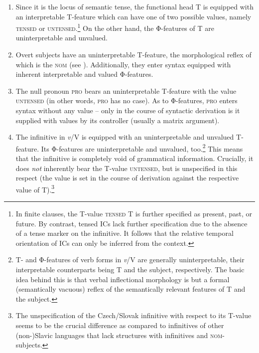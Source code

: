 \documentclass[output=paper,colorlinks,citecolor=brown,
modfonts,newtxmath
]{langscibook}
\begin{document}
\begin{enumerate}

\item Since it is the locus of semantic tense, the functional head T is equipped with an interpretable T-feature which can have one of two possible values, namely \textsc{tensed} or \textsc{untensed}.\footnote{In finite clauses, the T-value \textsc{tensed} T is further specified as present, past, or future. By contrast, tensed ICs lack further specification due to the absence of a tense marker on the infinitive. It follows that the relative temporal orientation of ICs can only be inferred from the context.} On the other hand, the Φ-features of T are uninterpretable and unvalued.

\item Overt subjects have an uninterpretable T-feature, the morphological reflex of which is the \textsc{nom} (see \citealt{PesetskyTorrego2001}). Additionally, they enter syntax equipped with inherent interpretable and valued Φ-features.

\item The null pronoun \textsc{pro} bears an uninterpretable T-feature with the value \textsc{untensed} (in other words, \textsc{pro} has no case). As to Φ-features, \textsc{pro} enters syntax without any value -- only in the course of syntactic derivation is it supplied with values by its controller (usually a matrix argument).

\item The infinitive in \textit{v}/V is equipped with an uninterpretable and unvalued T-feature. Its Φ-features are uninterpretable and unvalued, too.\footnote{T- and Φ-features of verb forms in \textit{v}/V are generally uninterpretable, their interpretable counterparts being T and the subject, respectively. The basic idea behind this is that verbal inflectional morphology is but a formal (semantically vacuous) reflex of the semantically relevant features of T and the subject.} This means that the infinitive is completely void of grammatical information. Crucially, it does \textit{not} inherently bear the T-value \textsc{untensed}, but is unspecified in this respect (the value is set in the course of derivation against the respective value of T).\footnote{The unspecification of the Czech/Slovak infinitive with respect to its T-value seems to be the crucial difference as compared to infinitives of other (non-)Slavic languages that lack structures with infinitives and \textsc{nom}-subjects.}

\end{enumerate}
\end{document}
